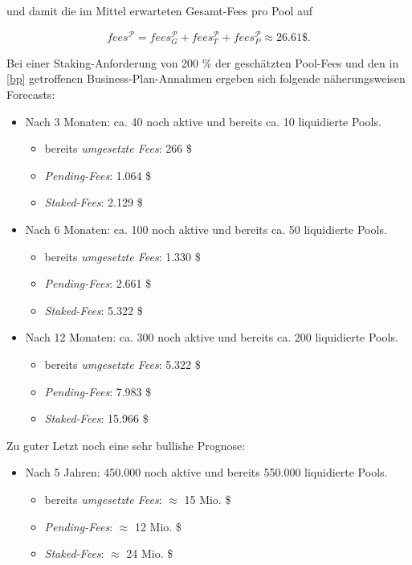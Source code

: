 \begin{Fazit}
und damit die im Mittel erwarteten Gesamt-Fees pro Pool auf

\begin{equation*}
  fees^{\mathcal{P}} = fees_{G}^{\mathcal{P}} + fees_{T}^{\mathcal{P}} + fees_{P}^{\mathcal{P}} \approx 26.61 \$. 
\end{equation*}

\vspace{0.67cm}

Bei einer Staking-Anforderung von 200 \% der geschätzten Pool-Fees  und den in \ref{bp} getroffenen Business-Plan-Annahmen ergeben sich folgende näherungsweisen Forecasts:

\begin{itemize}
	\item Nach 3 Monaten: ca. 40 noch aktive und bereits ca. 10 liquidierte Pools.
	\begin{itemize}
		\item bereits \textit{umgesetzte Fees}: 266 \$ 
		\item \textit{Pending-Fees}: 1.064 \$ 
		\item \textit{Staked-Fees}: 2.129 \$ 
	\end{itemize}
	\item Nach 6 Monaten: ca. 100 noch aktive und bereits ca. 50 liquidierte Pools.
	\begin{itemize}
		\item bereits \textit{umgesetzte Fees}: 1.330 \$ 
		\item \textit{Pending-Fees}: 2.661 \$ 
		\item \textit{Staked-Fees}: 5.322 \$ 
	\end{itemize}
	\item Nach 12 Monaten: ca. 300 noch aktive und bereits ca. 200 liquidierte Pools.
	\begin{itemize}
		\item bereits \textit{umgesetzte Fees}: 5.322 \$ 
		\item \textit{Pending-Fees}: 7.983 \$ 
		\item \textit{Staked-Fees}: 15.966 \$ 
	\end{itemize}	 
\end{itemize}

\vspace{0.5cm}

Zu guter Letzt noch eine sehr bullishe Prognose:

\begin{itemize}
	\item Nach 5 Jahren: 450.000 noch aktive und bereits 550.000 liquidierte Pools.
	\begin{itemize}
		\item bereits \textit{umgesetzte Fees}: $\approx$ 15 Mio. \$ 
		\item \textit{Pending-Fees}: $\approx$ 12 Mio. \$ 
		\item \textit{Staked-Fees}: $\approx$ 24 Mio. \$ 
	\end{itemize}	 
\end{itemize}

\end{Fazit}

